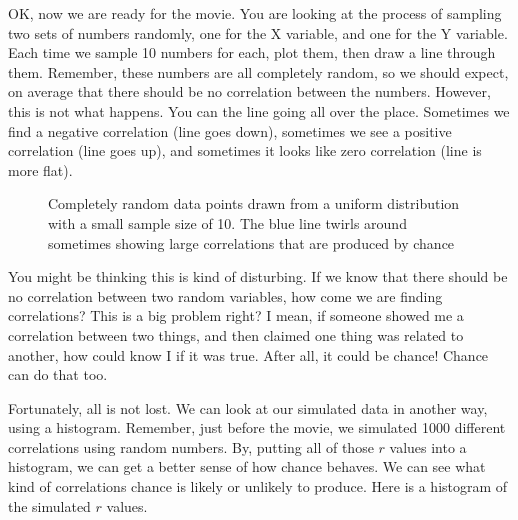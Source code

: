 \documentclass[
]{book}
\makeatletter
\newcommand*\pandocbounded[1]{%
  \sbox\pandoc@box{#1}%
  \Gscale@div\@tempa{\textheight}{\dimexpr\ht\pandoc@box+\dp\pandoc@box\relax}%
  \Gscale@div\@tempb{\linewidth}{\wd\pandoc@box}%
  \ifdim\@tempb\p@<\@tempa\p@\let\@tempa\@tempb\fi%
  \ifdim\@tempa\p@<\p@\scalebox{\@tempa}{\usebox\pandoc@box}%
  \else\usebox{\pandoc@box}%
  \fi%
}
\makeatother
\begin{document}
OK, now we are ready for the movie. You are looking at the process of sampling two sets of numbers randomly, one for the X variable, and one for the Y variable. Each time we sample 10 numbers for each, plot them, then draw a line through them. Remember, these numbers are all completely random, so we should expect, on average that there should be no correlation between the numbers. However, this is not what happens. You can the line going all over the place. Sometimes we find a negative correlation (line goes down), sometimes we see a positive correlation (line goes up), and sometimes it looks like zero correlation (line is more flat).

\begin{figure}
\centering
\pandocbounded{\texttt{[image: gifs/corUnifn10-1.gif]}}
\caption{\label{fig:3randcor10gif}Completely random data points drawn from a uniform distribution with a small sample size of 10. The blue line twirls around sometimes showing large correlations that are produced by chance}
\end{figure}

You might be thinking this is kind of disturbing. If we know that there should be no correlation between two random variables, how come we are finding correlations? This is a big problem right? I mean, if someone showed me a correlation between two things, and then claimed one thing was related to another, how could know I if it was true. After all, it could be chance! Chance can do that too.

Fortunately, all is not lost. We can look at our simulated data in another way, using a histogram. Remember, just before the movie, we simulated 1000 different correlations using random numbers. By, putting all of those \(r\) values into a histogram, we can get a better sense of how chance behaves. We can see what kind of correlations chance is likely or unlikely to produce. Here is a histogram of the simulated \(r\) values.
\end{document}
